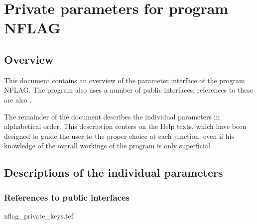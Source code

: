 
\chapter{ Private parameters for program NFLAG}
\tableofcontents


\section{ Overview}

	This document contains an overview of the parameter interface of the
program NFLAG. The program also uses a number of public interfaces; references
to these are also .



	The remainder of the document describes the individual parameters in
alphabetical order. This description centers on the Help texts, which have been
designed to guide the user to the proper choice at each junction, even if his
knowledge of the overall workings of the program is only superficial.


\section{ Descriptions of the individual parameters}
\label{.descriptions}

\subsection{ References to public interfaces}
\label{.public}

 {nflag_private_keys.tef}
